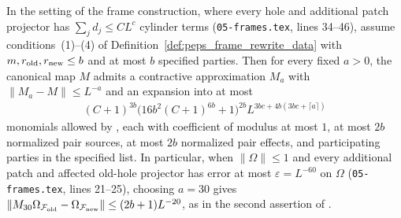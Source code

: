 \begin{lemma}
    \label{thm:peps_frame_small_rewrite_polynomial}
    \leanok
    In the setting of the frame construction, where every hole and additional patch projector has $\sum_jd_j\le CL^c$
    cylinder terms (\texttt{05-frames.tex}, lines
    34--46), assume conditions~(1)--(4) of Definition~\ref{def:peps_frame_rewrite_data} with $m,r_{\rm old},r_{\rm new}\le b$ and at most $b$ specified parties. Then for every
    fixed $a>0$, the canonical map $M$ admits a contractive approximation $M_a$
    with $\lVert M_a-M\rVert\le L^{-a}$ and an expansion into at most
    \begin{align}
        (C+1)^{3b}\bigl(16b^2(C+1)^{6b}+1\bigr)^{2b}L^{3bc+4b(3bc+\lceil a\rceil)}
        \label{eq:peps_frame_poly_monomial_count}
    \end{align}
    monomials allowed by \cite[Theorem~5.2]{OpenAI2026PolynomialPEPS}, each with coefficient of modulus at most $1$, at most $2b$ normalized pair sources, at most $2b$ normalized pair effects, and participating parties in the specified list. In
    particular, when $\lVert\Omega\rVert\le1$ and every additional patch
    and affected old-hole projector has error at most $\varepsilon=L^{-60}$ on $\Omega$
    (\texttt{05-frames.tex}, lines 21--25), choosing $a=30$ gives
    $\lVert M_{30}\Omega_{\mathcal F_{\rm old}}-\Omega_{\mathcal F_{\rm new}}
        \rVert\le(2b+1)L^{-20}$, as in the second
    assertion of \cite[Lemma~6.3]{OpenAI2026PolynomialPEPS}.
\end{lemma}

